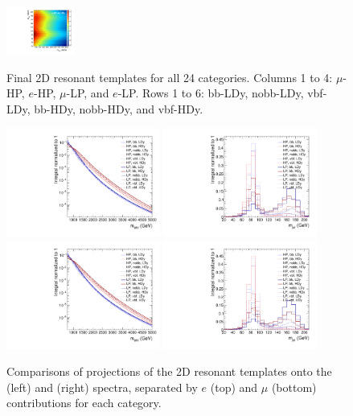 \begin{figure}[htbp]
  \includegraphics[width=0.2\textwidth]{fig/analysis/template_res_e_LP_vbf_HDy.pdf}\\
  \caption{
    Final 2D resonant templates for all 24 categories.
    Columns 1 to 4: $\mu$-HP, $e$-HP, $\mu$-LP, and $e$-LP.
    Rows 1 to 6: bb-LDy, nobb-LDy, vbf-LDy, bb-HDy, nobb-HDy, and vbf-HDy.
  }
  \label{fig:template_res_Run2}
\end{figure}

\begin{figure}[htbp]
  \centering
  \includegraphics[width=0.45\textwidth]{fig/analysis/compTemplate_res_e_MVV_log.pdf}
  \includegraphics[width=0.45\textwidth]{fig/analysis/compTemplate_res_e_MJJ.pdf}\\
  \includegraphics[width=0.45\textwidth]{fig/analysis/compTemplate_res_mu_MVV_log.pdf}
  \includegraphics[width=0.45\textwidth]{fig/analysis/compTemplate_res_mu_MJJ.pdf}\\
  \caption{
    Comparisons of projections of the 2D resonant templates onto the \MVV (left) and \MJ (right) spectra, separated by $e$ (top) and $\mu$ (bottom) contributions for each category.
  }
  \label{fig:compTemplate_res}
\end{figure}

